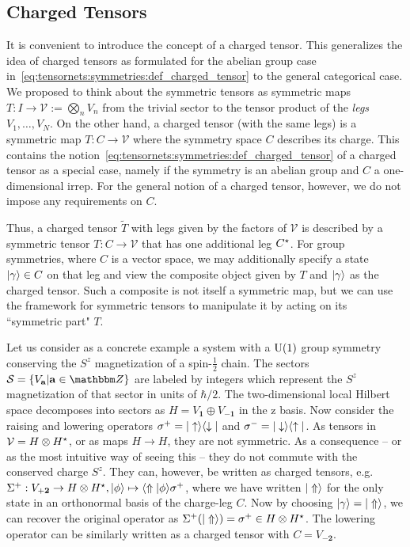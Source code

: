 \subsection{Charged Tensors}
\label{subsec:nonabelian:tns_library:charged_tensors}

It is convenient to introduce the concept of a charged tensor.
%
This generalizes the idea of charged tensors as formulated for the abelian group case in~\eqref{eq:tensornets:symmetries:def_charged_tensor} to the general categorical case.
%
We proposed to think about the symmetric tensors as symmetric maps $T: I \to \mathcal{V} := \bigotimes_n V_n$ from the trivial sector to the tensor product of the \emph{legs} $V_1, \dots, V_N$.
%
On the other hand, a charged tensor (with the same legs) is a symmetric map $T: C \to \mathcal{V}$ where the symmetry space $C$ describes its charge.
%
This contains the notion~\eqref{eq:tensornets:symmetries:def_charged_tensor} of a charged tensor as a special case, namely if the symmetry is an abelian group and $C$ a one-dimensional irrep.
%
For the general notion of a charged tensor, however, we do not impose any requirements on $C$.

Thus, a charged tensor $\tilde{T}$ with legs given by the factors of $\mathcal{V}$ is described by a symmetric tensor $T: C \to \mathcal{V}$ that has one additional leg $C^\star$.
%
For group symmetries, where $C$ is a vector space, we may additionally specify a state $\ket{\gamma} \in C$ on that leg and view the composite object given by $T$ and $\ket{\gamma}$ as the charged tensor.
%
Such a composite is not itself a symmetric map, but we can use the framework for symmetric tensors to manipulate it by acting on its ``symmetric part" $T$.

Let us consider as a concrete example a system with a $\mathrm{U}(1)$ group symmetry conserving the $S^z$ magnetization of a spin-$\tfrac{1}{2}$ chain.
%
The sectors $\mathcal{S} = \setdef{V_\mathbf{a}}{\mathbf{a} \in \Zbb}$ are labeled by integers which represent the $S^z$ magnetization of that sector in units of $\hbar/2$.
%
The two-dimensional local Hilbert space decomposes into sectors as $H = V_\mathbf{1} \oplus V_\mathbf{-1}$ in the z basis.
%
Now consider the raising and lowering operators $\sigma^+ = \ketbra{\uparrow}{\downarrow}$ and $\sigma^- = \ketbra{\downarrow}{\uparrow}$.
%
As tensors in $\mathcal{V} = H \otimes H^\star$, or as maps $H \to H$, they are not symmetric.
%
As a consequence -- or as the most intuitive way of seeing this -- they do not commute with the conserved charge $S^z$.
%
They can, however, be written as charged tensors, e.g.~$\Sigma^+ : V_{+\mathbf{2}} \to H \otimes \dualspace{H} , \ket{\phi} \mapsto \braket{\Uparrow}{\phi} \sigma^+$, where we have written $\ket{\Uparrow}$ for the only state in an orthonormal basis of the charge-leg $C$.
%
Now by choosing $\ket{\gamma} = \ket{\Uparrow}$, we can recover the original operator as $\Sigma^+(\ket{\Uparrow}) = \sigma^+ \in H \otimes \dualspace{H}$.
%
The lowering operator can be similarly written as a charged tensor with $C = V_{-\mathbf{2}}$.

